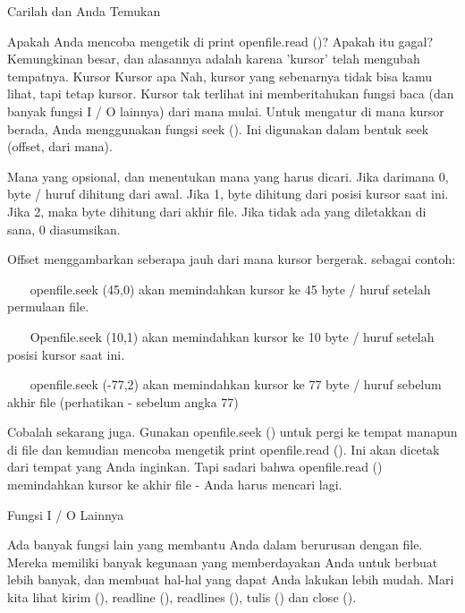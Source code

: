 Carilah dan Anda Temukan \par
\vspace{12pt}
Apakah Anda mencoba mengetik di print openfile.read ()? Apakah itu gagal? Kemungkinan besar, dan alasannya adalah karena 'kursor' telah mengubah tempatnya. Kursor Kursor apa Nah, kursor yang sebenarnya tidak bisa kamu lihat, tapi tetap kursor. Kursor tak terlihat ini memberitahukan fungsi baca (dan banyak fungsi I / O lainnya) dari mana mulai. Untuk mengatur di mana kursor berada, Anda menggunakan fungsi seek (). Ini digunakan dalam bentuk seek (offset, dari mana). \par
\vspace{12pt}
Mana yang opsional, dan menentukan mana yang harus dicari. Jika darimana 0, byte / huruf dihitung dari awal. Jika 1, byte dihitung dari posisi kursor saat ini. Jika 2, maka byte dihitung dari akhir file. Jika tidak ada yang diletakkan di sana, 0 diasumsikan. \par
\vspace{12pt}
Offset menggambarkan seberapa jauh dari mana kursor bergerak. sebagai contoh: \par
\vspace{12pt}
~~~ openfile.seek (45,0) akan memindahkan kursor ke 45 byte / huruf setelah permulaan file. \par
~~~ Openfile.seek (10,1) akan memindahkan kursor ke 10 byte / huruf setelah posisi kursor saat ini. \par
~~~ openfile.seek (-77,2) akan memindahkan kursor ke 77 byte / huruf sebelum akhir file (perhatikan - sebelum angka 77) \par
\vspace{12pt}
Cobalah sekarang juga. Gunakan openfile.seek () untuk pergi ke tempat manapun di file dan kemudian mencoba mengetik print openfile.read (). Ini akan dicetak dari tempat yang Anda inginkan. Tapi sadari bahwa openfile.read () memindahkan kursor ke akhir file - Anda harus mencari lagi. \par
\vspace{12pt}
Fungsi I / O Lainnya \par
\vspace{12pt}
Ada banyak fungsi lain yang membantu Anda dalam berurusan dengan file. Mereka memiliki banyak kegunaan yang memberdayakan Anda untuk berbuat lebih banyak, dan membuat hal-hal yang dapat Anda lakukan lebih mudah. Mari kita lihat kirim (), readline (), readlines (), tulis () dan close (). \par
\vspace{12pt}
